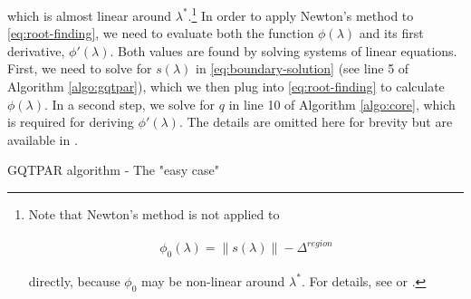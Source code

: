\noindent which is almost linear around $\lambda^*$.\footnote{Note that Newton's method is not applied to

\begin{align}
    \phi_0 (\lambda) = \lVert s (\lambda) \rVert - \Delta^{region}
    \label{eq:root-finding}
\end{align}

\noindent directly, because $\phi_0$ may be non-linear around $\lambda^*$. For details, see \cite{More1983} or \cite{Nocedal2006}.}
In order to apply Newton's method to \ref{eq:root-finding}, we need to evaluate both the function $\phi(\lambda)$ and its first derivative, $\phi'(\lambda)$. Both values are found by solving systems of linear equations.
First, we need to solve for $s(\lambda)$ in \ref{eq:boundary-solution} (see line 5 of Algorithm \ref{algo:gqtpar}), which we then plug into \ref{eq:root-finding} to calculate $\phi(\lambda)$.
In a second step, we solve for $q$ in line 10 of Algorithm \ref{algo:core}, which is required for deriving $\phi'(\lambda)$. The details are omitted here for brevity but are available in \cite{Conn2000}.


\begin{algorithm}
    \caption{GQTPAR algorithm - The "easy case"} \label{algo:gqtpar}
                    \end{algorithm}

